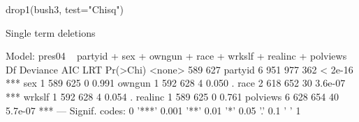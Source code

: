 \begin{Schunk}
\begin{Sinput}
 drop1(bush3, test="Chisq")
\end{Sinput}
\begin{Soutput}
Single term deletions

Model:
pres04 ~ partyid + sex + owngun + race + wrkslf + realinc + polviews
         Df Deviance AIC LRT Pr(>Chi)    
<none>           589 627                 
partyid   6      951 977 362  < 2e-16 ***
sex       1      589 625   0    0.991    
owngun    1      592 628   4    0.050 .  
race      2      618 652  30  3.6e-07 ***
wrkslf    1      592 628   4    0.054 .  
realinc   1      589 625   0    0.761    
polviews  6      628 654  40  5.7e-07 ***
---
Signif. codes:  0 '***' 0.001 '**' 0.01 '*' 0.05 '.' 0.1 ' ' 1 
\end{Soutput}
\end{Schunk}
